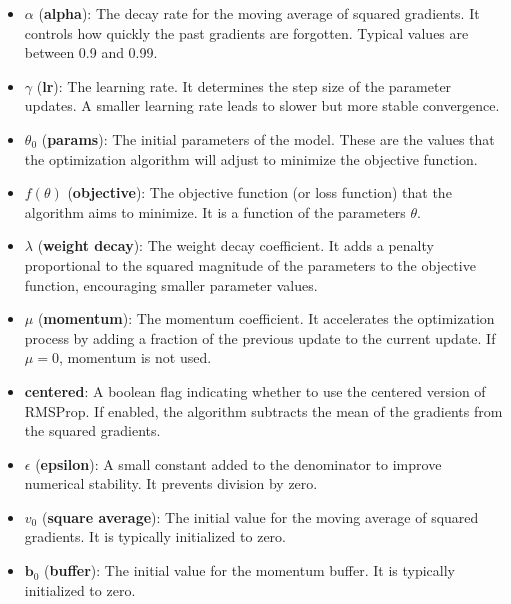 \documentclass{article}
\begin{document}
\begin{itemize}
    \item \(\alpha\) (\textbf{alpha}): The decay rate for the moving average of squared gradients. It controls how quickly the past gradients are forgotten. Typical values are between 0.9 and 0.99.
    
    \item \(\gamma\) (\textbf{lr}): The learning rate. It determines the step size of the parameter updates. A smaller learning rate leads to slower but more stable convergence.
    
    \item \(\theta_0\) (\textbf{params}): The initial parameters of the model. These are the values that the optimization algorithm will adjust to minimize the objective function.
    
    \item \(f(\theta)\) (\textbf{objective}): The objective function (or loss function) that the algorithm aims to minimize. It is a function of the parameters \(\theta\).
    
    \item \(\lambda\) (\textbf{weight decay}): The weight decay coefficient. It adds a penalty proportional to the squared magnitude of the parameters to the objective function, encouraging smaller parameter values.
    
    \item \(\mu\) (\textbf{momentum}): The momentum coefficient. It accelerates the optimization process by adding a fraction of the previous update to the current update. If \(\mu = 0\), momentum is not used.
    
    \item \textbf{centered}: A boolean flag indicating whether to use the centered version of RMSProp. If enabled, the algorithm subtracts the mean of the gradients from the squared gradients.
    
    \item \(\epsilon\) (\textbf{epsilon}): A small constant added to the denominator to improve numerical stability. It prevents division by zero.
    
    \item \(v_0\) (\textbf{square average}): The initial value for the moving average of squared gradients. It is typically initialized to zero.
    
    \item \(\textbf{b}_0\) (\textbf{buffer}): The initial value for the momentum buffer. It is typically initialized to zero.
    

\end{itemize}
\end{document}
